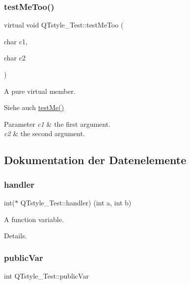 \subsubsection{\texorpdfstring{test\+Me\+Too()}{testMeToo()}}
{\footnotesize\ttfamily virtual void Q\+Tstyle\+\_\+\+Test\+::test\+Me\+Too (\begin{DoxyParamCaption}\item[{char}]{c1,  }\item[{char}]{c2 }\end{DoxyParamCaption})\hspace{0.3cm}{\ttfamily [pure virtual]}}



A pure virtual member. 

\begin{DoxySeeAlso}{Siehe auch}
\hyperlink{class_q_tstyle___test_a8840748753118dd468e8368a28e49c62}{test\+Me()} 
\end{DoxySeeAlso}

\begin{DoxyParams}{Parameter}
{\em c1} & the first argument. \\
\hline
{\em c2} & the second argument. \\
\hline
\end{DoxyParams}


\subsection{Dokumentation der Datenelemente}
\mbox{\label{class_q_tstyle___test_a79dd4e5498f09057775a819d911349e2}} 
\subsubsection{\texorpdfstring{handler}{handler}}
{\footnotesize\ttfamily int($\ast$ Q\+Tstyle\+\_\+\+Test\+::handler) (int a, int b)}



A function variable. 

Details. \mbox{\label{class_q_tstyle___test_aabf7b2e9ed83ea44aca4d213baae06d3}} 
\subsubsection{\texorpdfstring{public\+Var}{publicVar}}
{\footnotesize\ttfamily int Q\+Tstyle\+\_\+\+Test\+::public\+Var}



